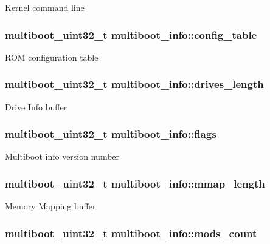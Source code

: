 Kernel command line \hypertarget{structmultiboot__info_a919ce01f85d05ab90857f8591dfb3948}{
\subsubsection[{config\+\_\+table}]{\setlength{\rightskip}{0pt plus 5cm}multiboot\+\_\+uint32\+\_\+t multiboot\+\_\+info\+::config\+\_\+table}}\label{structmultiboot__info_a919ce01f85d05ab90857f8591dfb3948}
R\+O\+M configuration table \hypertarget{structmultiboot__info_abe859eaa7e97309f072b3bc1caf5742e}{
\subsubsection[{drives\+\_\+length}]{\setlength{\rightskip}{0pt plus 5cm}multiboot\+\_\+uint32\+\_\+t multiboot\+\_\+info\+::drives\+\_\+length}}\label{structmultiboot__info_abe859eaa7e97309f072b3bc1caf5742e}
Drive Info buffer \hypertarget{structmultiboot__info_aa562865bc325fd785c9fa4c5056294f3}{
\subsubsection[{flags}]{\setlength{\rightskip}{0pt plus 5cm}multiboot\+\_\+uint32\+\_\+t multiboot\+\_\+info\+::flags}}\label{structmultiboot__info_aa562865bc325fd785c9fa4c5056294f3}
Multiboot info version number \hypertarget{structmultiboot__info_a86a0d881c5233a4b1c8cd690ccd19b75}{
\subsubsection[{mmap\+\_\+length}]{\setlength{\rightskip}{0pt plus 5cm}multiboot\+\_\+uint32\+\_\+t multiboot\+\_\+info\+::mmap\+\_\+length}}\label{structmultiboot__info_a86a0d881c5233a4b1c8cd690ccd19b75}
Memory Mapping buffer \hypertarget{structmultiboot__info_aebdafce31f94277d138202f7b1ec35cc}{
\subsubsection[{mods\+\_\+count}]{\setlength{\rightskip}{0pt plus 5cm}multiboot\+\_\+uint32\+\_\+t multiboot\+\_\+info\+::mods\+\_\+count}}\label{structmultiboot__info_aebdafce31f94277d138202f7b1ec35cc}
